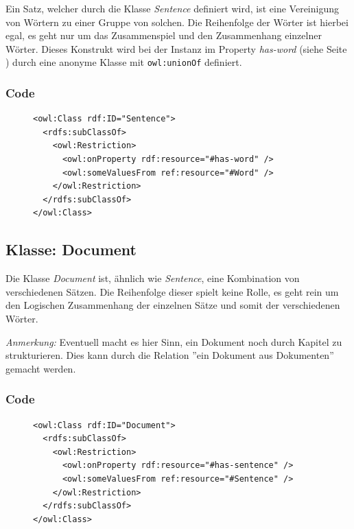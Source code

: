 \documentclass[draft,
    11pt,
    latin1,
    a4paper,
    oneside
]{scrreprt}
\let\oldemph=\emph
\renewcommand{\emph}[1]{\index{#1}\oldemph{#1}}
\begin{document}
Ein Satz, welcher durch die Klasse \emph{Sentence} definiert wird, ist eine Vereinigung von W\"ortern zu einer Gruppe von solchen. Die Reihenfolge der W\"orter ist hierbei egal, es geht nur um das Zusammenspiel und den Zusammenhang einzelner W\"orter. Dieses Konstrukt wird bei der Instanz im Property \emph{has-word} (siehe  Seite \pageref{sec:rel_hasword}) durch eine anonyme Klasse mit \texttt{owl:unionOf} definiert.

\subsubsection{Code}  \label{sec:class_sentence_code}

\begin{figure}[H]
 \lstset{language=XML}
 \begin{lstlisting}[label=owl:sentence,caption={Die Klasse \emph{Sentence} f\"ugt einzelne W\"orter zu einem Satz zusammen}]
<owl:Class rdf:ID="Sentence">
  <rdfs:subClassOf>
    <owl:Restriction>
      <owl:onProperty rdf:resource="#has-word" />
      <owl:someValuesFrom ref:resource="#Word" />
    </owl:Restriction>
  </rdfs:subClassOf>
</owl:Class>
 \end{lstlisting}
\end{figure}

\subsection{Klasse: Document} \label{sec:class_document}

Die Klasse \emph{Document} ist, \"ahnlich wie \emph{Sentence}, eine Kombination von verschiedenen S\"atzen. Die Reihenfolge dieser spielt keine Rolle, es geht rein um den Logischen Zusammenhang der einzelnen S\"atze und somit der verschiedenen W\"orter.

\textit{Anmerkung:} Eventuell macht es hier Sinn, ein Dokument noch durch Kapitel zu strukturieren. Dies kann durch die Relation ''ein Dokument aus Dokumenten'' gemacht werden.

\subsubsection{Code}  \label{sec:class_sentence_code}

\begin{figure}[H]
 \lstset{language=XML}
 \begin{lstlisting}[label=owl:document,caption={Die Klasse \emph{Document} f\"ugt einzelne S\"atze zu einem Dokument zusammen}]
<owl:Class rdf:ID="Document">
  <rdfs:subClassOf>
    <owl:Restriction>
      <owl:onProperty rdf:resource="#has-sentence" />
      <owl:someValuesFrom ref:resource="#Sentence" />
    </owl:Restriction>
  </rdfs:subClassOf>
</owl:Class>
 \end{lstlisting}
\end{figure}
\end{document}
